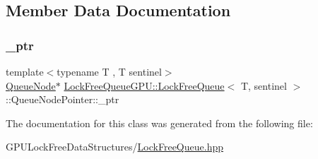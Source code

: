 \subsection{Member Data Documentation}
\mbox{\label{class_lock_free_queue_g_p_u_1_1_lock_free_queue_1_1_queue_node_pointer_a668c69b8c98e86b403590d1ca0734983}} 
\subsubsection{\texorpdfstring{\+\_\+ptr}{\_ptr}}
{\footnotesize\ttfamily template$<$typename T , T sentinel$>$ \\
\mbox{\hyperlink{class_lock_free_queue_g_p_u_1_1_lock_free_queue_1_1_queue_node}{Queue\+Node}}$\ast$ \mbox{\hyperlink{class_lock_free_queue_g_p_u_1_1_lock_free_queue}{Lock\+Free\+Queue\+G\+P\+U\+::\+Lock\+Free\+Queue}}$<$ T, sentinel $>$\+::Queue\+Node\+Pointer\+::\+\_\+ptr\hspace{0.3cm}{\ttfamily [private]}}



The documentation for this class was generated from the following file\+:\begin{DoxyCompactItemize}
\item 
G\+P\+U\+Lock\+Free\+Data\+Structures/\mbox{\hyperlink{_lock_free_queue_8hpp}{Lock\+Free\+Queue.\+hpp}}\end{DoxyCompactItemize}
